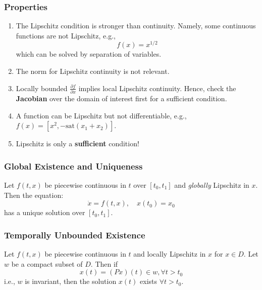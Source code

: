 

\subsubsection{Properties}
\begin{enumerate}
    \item The Lipschitz condition is stronger than continuity. Namely, some continuous functions are not Lipschitz, e.g.,
          \noindent\begin{equation*}
              f (x) = x^{1/2}
          \end{equation*}
          which can be solved by separation of variables.
    \item The norm for Lipschitz continuity is not relevant.
    \item Locally bounded $\frac{\partial f}{\partial x}$ implies local Lipschitz continuity. Hence, check the \textbf{Jacobian} over the domain of interest first for a sufficient condition.
    \item A function can be Lipschitz but not differentiable, e.g., $f (x) = [x^2, - \text{sat}(x_1 + x_2)]$.
    \item Lipschitz is only a \textbf{sufficient} condition!
\end{enumerate}

\subsubsection{Global Existence and Uniqueness}

Let $f (t, x)$ be piecewise continuous in $t$ over $[t_0, t_1]$ and \textit{globally} Lipschitz in $x$. Then the equation:
\noindent\begin{equation*}
    \dot{x} = f (t, x), \quad x (t_0) = x_0
\end{equation*}
has a unique solution over $[t_0, t_1]$.

\subsubsection{Temporally Unbounded Existence}

Let $f(t, x)$ be piecewise continuous in $t$ and locally Lipschitz
in $x$ for $x \in D$. Let $w$ be a compact subset of $D$. Then if
\noindent\begin{equation*}
    x(t) = (Px)(t) \in w, \forall t > t_0
\end{equation*}
i.e., $w$ is invariant, then the solution $x(t)$ exists $\forall t > t_0$.

